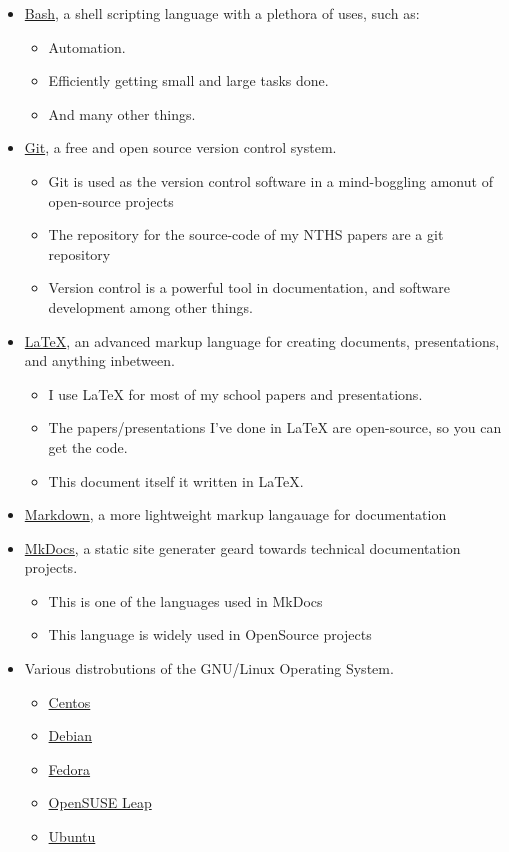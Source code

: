 \begin{itemize}
	\item {\href{https://www.gnu.org/software/bash/}{Bash}, a shell scripting language with a plethora of uses, such as:}
		\begin{itemize}
			\item Automation.
			\item Efficiently getting small and large tasks done.
			\item And many other things.
		\end{itemize}
	\item {\href{https://git-scm.com/}{Git}, a free and open source version control system.}
		\begin{itemize}
			\item Git is used as the version control software in a mind-boggling amonut of open-source projects
			\item The repository for the source-code of my NTHS papers are a git repository
			\item Version control is a powerful tool in documentation, and software development among other things.
		\end{itemize}
	\item {\href{https://www.latex-project.org/}{\LaTeX{}}, an advanced markup language for creating documents, presentations, and anything inbetween.}
		\begin{itemize}
			\item I use \LaTeX{} for most of my school papers and presentations.
			\item The papers/presentations I've done in \LaTeX{} are open-source, so you can get the code.
			\item This document itself it written in \LaTeX{}.
		\end{itemize}
	\item {\href{https://guides.github.com/features/mastering-markdown/}{Markdown}, a more lightweight markup langauage for documentation}
	\item { \href{http://www.mkdocs.org/}{MkDocs}, a static site generater geard towards technical documentation projects.}
		\begin{itemize}
			\item This is one of the languages used in MkDocs
			\item This language is widely used in OpenSource projects
		\end{itemize}
	\item {Various distrobutions of the GNU/Linux Operating System.}
		\begin{itemize}
			\item {\href{https://www.centos.org/}{Centos}}
			\item {\href{https://www.debian.org/}{Debian}}
			\item {\href{https://getfedora.org/}{Fedora}}
			\item {\href{https://www.opensuse.org/}{OpenSUSE Leap}}
			\item {\href{https://www.ubuntu.com/}{Ubuntu}}
		\end{itemize}
\end{itemize}

